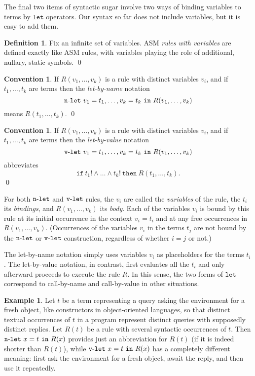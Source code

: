 \documentclass{LMCS}
\theoremstyle{definition}
\newtheorem{df}[thm]{Definition}
\newtheorem{ex}[thm]{Example}
\newtheorem{conn}[thm]{Convention}
\newcommand{\nlet}{\ensuremath{\ttt{n}\text-\ttt{let}\ }}
\newcommand{\ttt}[1]{\ensuremath{\mathtt {#1}}}
\newcommand{\vlet}{\ensuremath{\ttt{v}\text-\ttt{let}\ }}
\begin{document}
The final two items of syntactic sugar involve two ways of binding
variables to terms by \ttt{let} operators.  Our syntax so far does not
include variables, but it is easy to add them.

\begin{df}
  Fix an infinite set of variables.  ASM \emph{rules with variables}
  are defined exactly like ASM rules, with variables playing the role
  of additional, nullary, static symbols.
\qed\end{df}

\begin{conn}
  If $R(v_1,\dots,v_k)$ is a rule with distinct variables $v_i$, and
  if $t_1,\dots,t_k$ are terms then the \emph{let-by-name}
  notation
$$
\nlet v_1=t_1,\dots,v_k=t_k\ttt{\ in\ }R(v_1,\dots,v_k)
$$ means $R(t_1,\dots,t_k)$.  \qed\end{conn}

\begin{conn}
  If $R(v_1,\dots,v_k)$ is a rule with distinct variables $v_i$, and
  if $t_1,\dots,t_k$ are terms then the \emph{let-by-value}
  notation
$$
\vlet v_1=t_1,\dots,v_k=t_k\ttt{\ in\ }R(v_1,\dots,v_k)
$$
abbreviates
$$
\ttt{if\ }t_1!\land\dots\land t_k!\ttt{\ then\ }R(t_1,\dots,t_k).
$$
\qed\end{conn}

For both \nlet and \vlet rules, the $v_i$ are called the
\emph{variables} of the rule, the $t_i$ its \emph{bindings}, and
$R(v_1,\dots,v_k)$ its \emph{body}.  Each of the variables $v_i$ is
bound by this rule at its initial occurrence in the context $v_i=t_i$
and at any free occurrences in $R(v_1,\dots,v_k)$.  (Occurrences of
the variables $v_i$ in the terms $t_j$ are not bound by the \nlet or
\vlet construction, regardless of whether $i=j$ or not.)

The let-by-name notation simply uses variables $v_i$ as placeholders for
the terms $t_i$.  The let-by-value notation, in contrast, first evaluates
all the $t_i$ and only afterward proceeds to execute the rule $R$.  In
this sense, the two forms of \ttt{let} correspond to call-by-name and
call-by-value in other situations.

\begin{ex} \label{ex:let} Let $t$ be a term representing a query asking the
environment for a fresh object, like constructors in object-oriented
languages, so that distinct textual occurrences of $t$ in a program
represent distinct queries with supposedly distinct replies.  Let $R(t)$
be a rule with several syntactic occurrences of $t$.  Then $\nlet x=t
\ttt{\ in\ }R(x)$ provides just an abbreviation for $R(t)$ (if it is
indeed shorter than $R(t)$), while $\vlet x=t \ttt{\ in\ }R(x)$ has a
completely different meaning: first ask the environment for a fresh
object, await the reply, and then use it repeatedly.
\end{ex}
\end{document}
